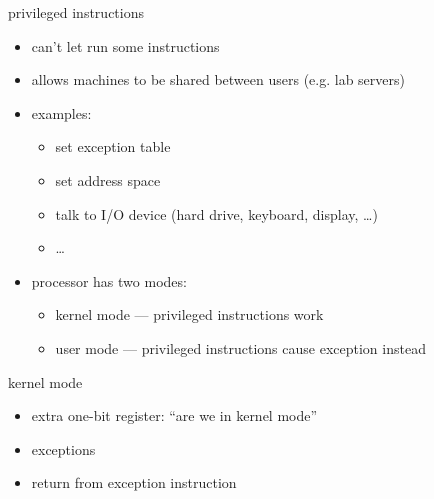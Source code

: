 \begin{frame}{privileged instructions}
\begin{itemize}
\item can't let  run some instructions
\item allows machines to be shared between users (e.g. lab servers)
\item examples:
    \begin{itemize}
    \item set exception table
    \item set address space
    \item talk to I/O device (hard drive, keyboard, display, \ldots)
    \item \ldots
    \end{itemize}
\item processor has two modes:
\begin{itemize}
    \item kernel mode --- privileged instructions work
    \item user mode --- privileged instructions cause exception instead
\end{itemize}
\end{itemize}
\end{frame}

\begin{frame}{kernel mode}
\begin{itemize}
\item extra one-bit register: ``are we in kernel mode''
\item exceptions 
\item return from exception instruction 
\end{itemize}
\end{frame}


